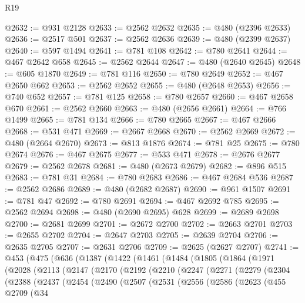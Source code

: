 \begin{lexlean}{R19}
\begin{coremodule}
@2632 := @931 @2128
@2633 := @2562 @2632
@2635 := @480 (@2396 @2633)
@2636 := @2517 @501
@2637 := @2562 @2636
@2639 := @480 (@2399 @2637)
@2640 := @597 @1494
@2641 := @781 @108
@2642 := @780 @2641
@2644 := @467 @2642 @658
@2645 := @2562 @2644
@2647 := @480 (@2640 @2645)
@2648 := @605 @1870
@2649 := @781 @116
@2650 := @780 @2649
@2652 := @467 @2650 @662
@2653 := @2562 @2652
@2655 := @480 (@2648 @2653)
@2656 := @740 @652
@2657 := @781 @125
@2658 := @780 @2657
@2660 := @467 @2658 @670
@2661 := @2562 @2660
@2663 := @480 (@2656 @2661)
@2664 := @766 @1499
@2665 := @781 @134
@2666 := @780 @2665
@2667 := @467 @2666
@2668 := @531 @471
@2669 := @2667 @2668
@2670 := @2562 @2669
@2672 := @480 (@2664 @2670)
@2673 := @813 @1876
@2674 := @781 @25
@2675 := @780 @2674
@2676 := @467 @2675
@2677 := @533 @471
@2678 := @2676 @2677
@2679 := @2562 @2678
@2681 := @480 (@2673 @2679)
@2682 := @896 @515
@2683 := @781 @31
@2684 := @780 @2683
@2686 := @467 @2684 @536
@2687 := @2562 @2686
@2689 := @480 (@2682 @2687)
@2690 := @961 @1507
@2691 := @781 @47
@2692 := @780 @2691
@2694 := @467 @2692 @785
@2695 := @2562 @2694
@2698 := @480 (@2690 @2695) @628
@2699 := @2689 @2698
@2700 := @2681 @2699
@2701 := @2672 @2700
@2702 := @2663 @2701
@2703 := @2655 @2702
@2704 := @2647 @2703
@2705 := @2639 @2704
@2706 := @2635 @2705
@2707 := @2631 @2706
@2709 := @2625 (@2627 @2707)
@2741 := @453
    (@475
      (@636
        (@1387
          (@1422
            (@1461
              (@1484
                (@1805
                  (@1864
                    (@1971
                      (@2028
                        (@2113
                          (@2147
                            (@2170
                              (@2192
                                (@2210
                                  (@2247
                                    (@2271
                                      (@2279
                                        (@2304
                                          (@2388
                                            (@2437
                                              (@2454
                                                (@2490
                                                  (@2507
                                                    (@2531
                                                      (@2556
                                                        (@2586
                                                          (@2623
                                                            (@455
                                                              @2709
                                                              (@34

\end{coremodule}
\end{lexlean}
